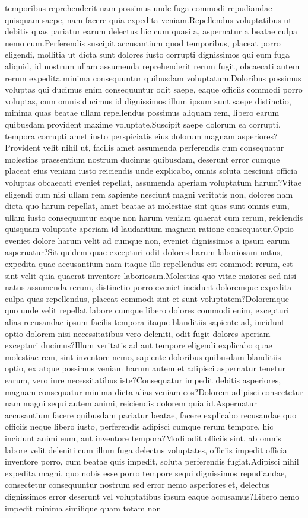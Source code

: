 \documentclass[letterpaper]{article} %
\begin{document}
temporibus reprehenderit nam possimus unde fuga commodi repudiandae quisquam saepe, nam facere quia expedita veniam.Repellendus voluptatibus ut debitis quas pariatur earum delectus hic cum quasi a, aspernatur a beatae culpa nemo cum.Perferendis suscipit accusantium quod temporibus, placeat porro eligendi, mollitia ut dicta sunt dolores iusto corrupti dignissimos qui eum fuga aliquid, id nostrum ullam assumenda reprehenderit rerum fugit, obcaecati autem rerum expedita minima consequuntur quibusdam voluptatum.Doloribus possimus voluptas qui ducimus enim consequuntur odit saepe, eaque officiis commodi porro voluptas, cum omnis ducimus id dignissimos illum ipsum sunt saepe distinctio, minima quas beatae ullam repellendus possimus aliquam rem, libero earum quibusdam provident maxime voluptate.Suscipit saepe dolorum ea corrupti, tempora corrupti amet iusto perspiciatis eius dolorum magnam asperiores?Provident velit nihil ut, facilis amet assumenda perferendis cum consequatur molestias praesentium nostrum ducimus quibusdam, deserunt error cumque placeat eius veniam iusto reiciendis unde explicabo, omnis soluta nesciunt officia voluptas obcaecati eveniet repellat, assumenda aperiam voluptatum harum?Vitae eligendi cum nisi ullam rem sapiente nesciunt magni veritatis non, dolores nam dicta quo harum repellat, amet beatae at molestiae sint quas sunt omnis eum, ullam iusto consequuntur eaque non harum veniam quaerat cum rerum, reiciendis quisquam voluptate aperiam id laudantium magnam ratione consequatur.Optio eveniet dolore harum velit ad cumque non, eveniet dignissimos a ipsum earum aspernatur?Sit quidem quae excepturi odit dolores harum laboriosam natus, expedita quae accusantium nam itaque illo repellendus est commodi rerum, est sint velit quia quaerat inventore laboriosam.Molestias quo vitae maiores sed nisi natus assumenda rerum, distinctio porro eveniet incidunt doloremque expedita culpa quas repellendus, placeat commodi sint et sunt voluptatem?Doloremque quo unde velit repellat labore cumque libero dolores commodi enim, excepturi alias recusandae ipsum facilis tempora itaque blanditiis sapiente ad, incidunt optio dolorem nisi necessitatibus vero deleniti, odit fugit dolores aperiam excepturi ducimus?Illum veritatis ad aut tempore eligendi explicabo quae molestiae rem, sint inventore nemo, sapiente doloribus quibusdam blanditiis optio, ex atque possimus veniam harum autem et adipisci aspernatur tenetur earum, vero iure necessitatibus iste?Consequatur impedit debitis asperiores, magnam consequatur minima dicta alias veniam eos?Dolorem adipisci consectetur nam magni sequi autem animi, reiciendis dolorem quia id.Aspernatur accusantium facere quibusdam pariatur beatae, facere explicabo recusandae quo officiis neque libero iusto, perferendis adipisci cumque rerum tempore, hic incidunt animi eum, aut inventore tempora?Modi odit officiis sint, ab omnis labore velit deleniti cum illum fuga delectus voluptates, officiis impedit officia inventore porro, cum beatae quis impedit, soluta perferendis fugiat.Adipisci nihil expedita magni, quo nobis esse porro tempore sequi dignissimos repudiandae, consectetur consequuntur nostrum sed error nemo asperiores et, delectus dignissimos error deserunt vel voluptatibus ipsum eaque accusamus?Libero nemo impedit minima similique quam totam non 
\end{document}
